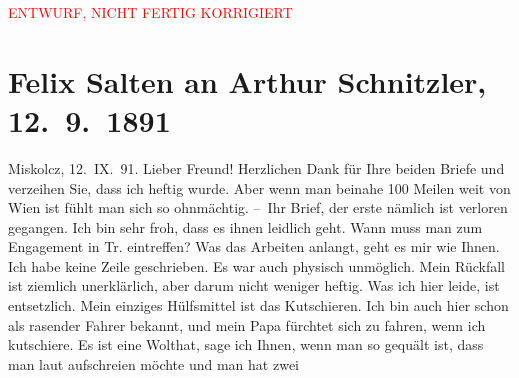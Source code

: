 
\begin{center}
            \textcolor{red}{ENTWURF, NICHT FERTIG KORRIGIERT}
                      \end{center}
            
         
         \renewcommand{\erwaehntePersonen}{Personen:  ?? [Bergdirektor],  ?? [Ingenieur], Philipp Salzmann, Michael Emil Salzmann}
         \renewcommand{\erwaehnteOrte}{Orte: Café Kremser, Italien, Miskolc, Opava, Uppony, Upponyi-szoros, Wien}
         \renewcommand{\erwaehnteWerke}{}
               \section[Felix Salten an Arthur Schnitzler, 12. 9. 1891]{ Felix Salten an Arthur Schnitzler, 12. 9. 1891}\nopagebreak{}\rehead{ }\begin{ledgroupsized}[t]{13cm}\normalsize\beginnumbering \toendnotes[C]{\smallbreak\pagebreak[2]} 
\toendnotes[C]{\smallbreak}\pstart
           {\pb}Miskolcz, 12. IX. 91.
               \pend
           \pstart
           Lieber Freund! Herzlichen Dank für Ihre beiden Briefe und verzeihen
               Sie, dass ich heftig wurde. Aber wenn man beinahe 100 Meilen weit von Wien ist fühlt man sich so ohnmächtig. \pend
           \pstart
           – Ihr Brief, der erste nämlich ist verloren gegangen. Ich bin sehr froh, dass es
               ihnen leidlich geht. Wann muss man zum Engagement in Tr. eintreffen? Was das Arbeiten anlangt, geht es mir wie Ihnen. Ich habe
               keine Zeile geschrieben. Es war auch physisch unmöglich. Mein Rückfall ist ziemlich
               unerklärlich, aber darum nicht weniger heftig. Was ich hier leide, ist entsetzlich.
               Mein einziges Hülfsmittel ist das Kutschieren. Ich bin auch hier schon als rasender
               Fahrer bekannt, und mein Papa fürchtet sich zu fahren, wenn ich kutschiere. Es ist eine Wolthat, sage
               ich Ihnen, wenn man so gequält ist, dass man laut aufschreien möchte und man hat zwei

\end{ledgroupsized}
